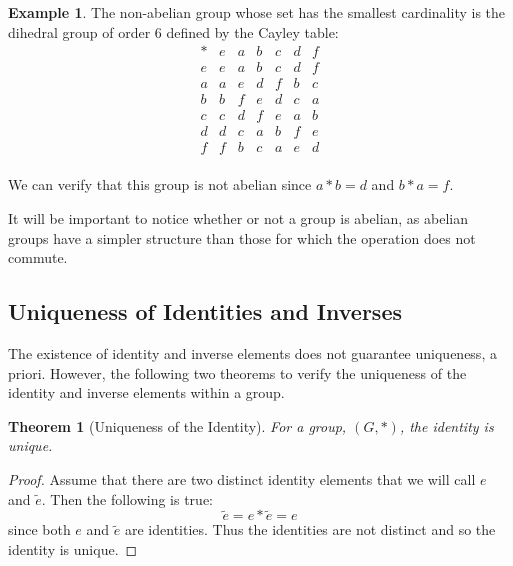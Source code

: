 \documentclass[
]{book}
\newtheorem{theorem}{Theorem}[chapter]
\theoremstyle{definition}
\theoremstyle{definition}
\newtheorem{example}{Example}[chapter]
\theoremstyle{definition}
\theoremstyle{remark}
\begin{document}
\begin{example}
\protect\hypertarget{exm:dihedral6}{}{\label{exm:dihedral6} }The non-abelian group whose set has the smallest cardinality is the dihedral group of order 6 defined by the Cayley table:
\[\begin{array}{c|cccccc}
* & e & a & b & c & d & f \\ \hline
e & e & a & b & c & d & f \\
a & a & e & d & f & b & c \\
b & b & f & e & d & c & a \\
c & c & d & f & e & a & b \\
d & d & c & a & b & f & e \\
f & f & b & c & a & e & d \\
\end{array}\]

We can verify that this group is not abelian since \(a*b = d\) and \(b*a=f\).
\end{example}

It will be important to notice whether or not a group is abelian, as abelian groups have a simpler structure than those for which the operation does not commute.

\hypertarget{uniqueness-of-identities-and-inverses}{%
\subsection{Uniqueness of Identities and Inverses}\label{uniqueness-of-identities-and-inverses}}

The existence of identity and inverse elements does not guarantee uniqueness, a priori. However, the following two theorems to verify the uniqueness of the identity and inverse elements within a group.

\begin{theorem}[Uniqueness of the Identity]
\protect\hypertarget{thm:unnamed-chunk-153}{}{\label{thm:unnamed-chunk-153} {} }For a group, \((G,*)\), the identity is unique.
\end{theorem}

\begin{proof}
{}Assume that there are two distinct identity elements that we will call \(e\) and \(\tilde{e}\). Then the following is true:\[\tilde{e}= e*\tilde{e} = e\] since both \(e\) and \(\tilde{e}\) are identities. Thus the identities are not distinct and so the identity is unique.
\end{proof}
\end{document}
